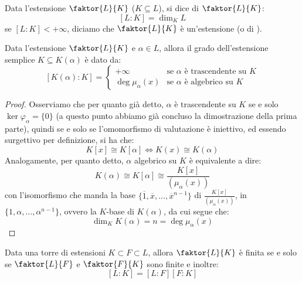 \documentclass[11pt]{scrartcl}
\begin{document}
\begin{definition}
    Data l'estensione $\faktor{L}{K}$ ($K \subseteq L$), si dice  di $\faktor{L}{K}$:
    \[ [L:K] = \dim_K L
        \]
    se $[L:K] < +\infty$, diciamo che $\faktor{L}{K}$ è un'estensione  (o di ).
\end{definition}

\begin{proposition}
    \label{3.7}
    Data l'estensione $\faktor{L}{K}$ e $\alpha \in L$, allora il grado dell'estensione semplice $K \subseteq K(\alpha)$ è dato da:
    \[ [K(\alpha) : K] = \begin{cases}
        +\infty & \text{se $\alpha$ è trascendente su $K$}\\
        \deg \mu_\alpha(x) & \text{se $\alpha$ è algebrico su $K$}
    \end{cases}
        \]
\end{proposition}

\begin{proof}
    Osserviamo che per quanto già detto, $\alpha$ è trascendente su $K$ se e solo $\ker \varphi_\alpha = \{0\}$ (a questo punto abbiamo già concluso la dimostrazione della prima parte), quindi se e solo se l'omomorfismo di valutazione è iniettivo, ed essendo 
    surgettivo per definizione, si ha che:
    \[ K[x] \cong K[\alpha] \iff K(x) \cong K(\alpha)
        \]
    Analogamente, per quanto detto, $\alpha$ algebrico su $K$ è equivalente a dire:
    \[ K(\alpha) \cong K[\alpha] \cong \frac{K[x]}{(\mu_\alpha(x))}
        \]
    con l'isomorfismo che manda la base $\{\overline 1, \overline x, \ldots, {\overline x}^{n-1}\}$ di $\displaystyle \frac{K[x]}{(\mu_\alpha(x))}$, in $\{1,\alpha,\ldots,\alpha^{n-1}\}$, ovvero la $K$-base di $K(\alpha)$, da cui segue 
    che:
    \[ \dim_K K(\alpha) = n = \deg \mu_\alpha(x)
        \]
\end{proof}

\begin{proposition}
    \label{torri}
    Data una torre di estensioni $K \subset F \subset L$, allora $\faktor{L}{K}$ è finita se e solo se $\faktor{L}{F}$ e $\faktor{F}{K}$ sono finite e inoltre:
    \[ [L:K] = [L:F][F:K]
        \]
\end{proposition}
\end{document}
